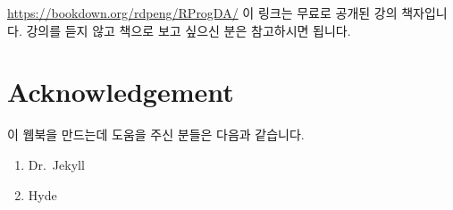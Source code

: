 \documentclass[10pt,]{krantz}
\providecommand{\tightlist}{%
  \setlength{\itemsep}{0pt}\setlength{\parskip}{0pt}}
\begin{document}
\url{https://bookdown.org/rdpeng/RProgDA/} 이 링크는 무료로 공개된 강의
책자입니다. 강의를 듣지 않고 책으로 보고 싶으신 분은 참고하시면 됩니다.

\chapter{Acknowledgement}\label{acknowledgement}

이 웹북을 만드는데 도움을 주신 분들은 다음과 같습니다.

\begin{enumerate}
\def\labelenumi{\arabic{enumi}.}
\tightlist
\item
  Dr.~Jekyll
\item
  Hyde
\end{enumerate}



\backmatter
\printindex
\end{document}
